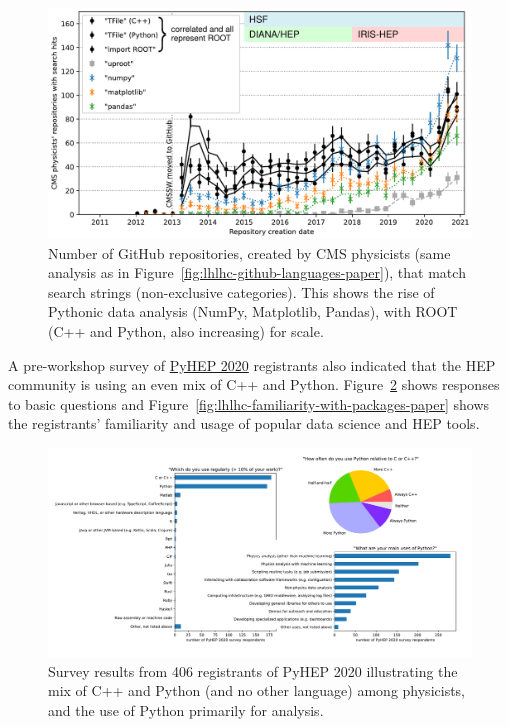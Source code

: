 \documentclass{article}
\begin{document}
\begin{figure}
\centering
\includegraphics[width=0.8\linewidth]{fig/lhlhc-github-overlay-lin-paper.pdf}

\caption{Number of GitHub repositories, created by CMS physicists (same analysis as in Figure~\ref{fig:lhlhc-github-languages-paper}), that match search strings (non-exclusive categories). This shows the rise of Pythonic data analysis (NumPy, Matplotlib, Pandas), with ROOT (C++ and Python, also increasing) for scale. \label{fig:lhlhc-github-overlay-lin-paper}}
\end{figure}

A pre-workshop survey of \href{https://indico.cern.ch/e/PyHEP2020}{PyHEP 2020} registrants also indicated that the HEP community is using an even mix of C++ and Python. Figure~\ref{fig:pyhep2020-survey-paper} shows responses to basic questions and Figure~\ref{fig:lhlhc-familiarity-with-packages-paper} shows the registrants' familiarity and usage of popular data science and HEP tools.

\begin{figure}
\centering
\includegraphics[width=\linewidth]{fig/pyhep2020-survey-paper.pdf}

\caption{Survey results from 406 registrants of PyHEP 2020 illustrating the mix of C++ and Python (and no other language) among physicists, and the use of Python primarily for analysis. \label{fig:pyhep2020-survey-paper}}
\end{figure}
\end{document}
